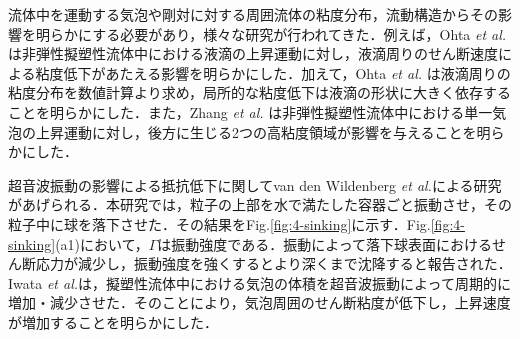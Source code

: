 流体中を運動する気泡や剛対に対する周囲流体の粘度分布，流動構造からその影響を明らかにする必要があり，様々な研究が行われてきた．例えば，Ohta {\it et al.} \cite{ref:2}は非弾性擬塑性流体中における液滴の上昇運動に対し，液滴周りのせん断速度による粘度低下があたえる影響を明らかにした．加えて，Ohta {\it et al.} \cite{ref:3}は液滴周りの粘度分布を数値計算より求め，局所的な粘度低下は液滴の形状に大きく依存することを明らかにした．また，Zhang {\it et al.} \cite{ref:4}は非弾性擬塑性流体中における単一気泡の上昇運動に対し，後方に生じる2つの高粘度領域が影響を与えることを明らかにした．

超音波振動の影響による抵抗低下に関してvan den Wildenberg {\it et al.}\cite{ref:6}による研究があげられる．本研究では，粒子の上部を水で満たした容器ごと振動させ，その粒子中に球を落下させた．その結果をFig.\ref{fig:4-sinking}に示す．Fig.\ref{fig:4-sinking}(a1)において，$\Gamma$は振動強度である．振動によって落下球表面におけるせん断応力が減少し，振動強度を強くするとより深くまで沈降すると報告された．Iwata {\it et al.}\cite{ref:5}は，擬塑性流体中における気泡の体積を超音波振動によって周期的に増加・減少させた．そのことにより，気泡周囲のせん断粘度が低下し，上昇速度が増加することを明らかにした．


